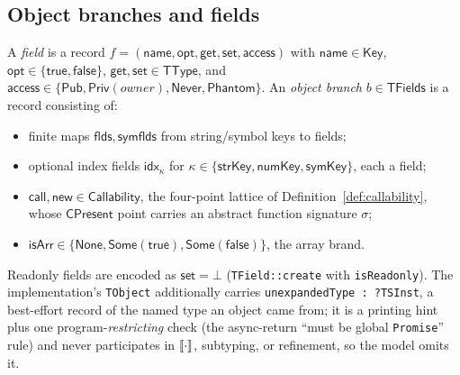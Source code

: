 \documentclass[11pt]{article}
\newcommand{\TType}{\mathsf{TType}}
\newcommand{\TFields}{\mathsf{TFields}}
\begin{document}
\subsection{Object branches and fields}

\begin{definition}
\label{def:fields}
A \emph{field} is a record
$f = (\mathsf{name}, \mathsf{opt}, \mathsf{get}, \mathsf{set},
\mathsf{access})$
with $\mathsf{name} \in \mathsf{Key}$, $\mathsf{opt} \in
\{\mathsf{true},\mathsf{false}\}$, $\mathsf{get}, \mathsf{set} \in \TType$,
and $\mathsf{access} \in \{\mathsf{Pub}, \mathsf{Priv}(\mathit{owner}),
\mathsf{Never}, \mathsf{Phantom}\}$.
An \emph{object branch} $b \in \TFields$ is a record consisting of:
\begin{itemize}
\item finite maps $\mathsf{flds}, \mathsf{symflds}$ from string/symbol keys
  to fields;
\item optional index fields $\mathsf{idx}_\kappa$ for
  $\kappa \in \{\mathsf{strKey}, \mathsf{numKey}, \mathsf{symKey}\}$, each a
  field;
\item $\mathsf{call}, \mathsf{new} \in \mathsf{Callability}$, the
  four-point lattice of Definition~\ref{def:callability}, whose
  $\mathsf{CPresent}$ point carries an abstract function signature
  $\sigma$;
\item $\mathsf{isArr} \in \{\mathsf{None}, \mathsf{Some}(\mathsf{true}),
  \mathsf{Some}(\mathsf{false})\}$, the array brand.
\end{itemize}
Readonly fields are encoded as $\mathsf{set} = \bot$
(\texttt{TField::create} with \texttt{isReadonly}).
The implementation's \texttt{TObject} additionally carries
\texttt{unexpandedType :\ ?TSInst}, a best-effort record of the named type
an object came from; it is a printing hint plus one program-\emph{restricting}
check (the async-return ``must be global \texttt{Promise}'' rule) and never
participates in $\llbracket \cdot \rrbracket$, subtyping, or refinement, so the model omits
it.
\end{definition}
\end{document}
